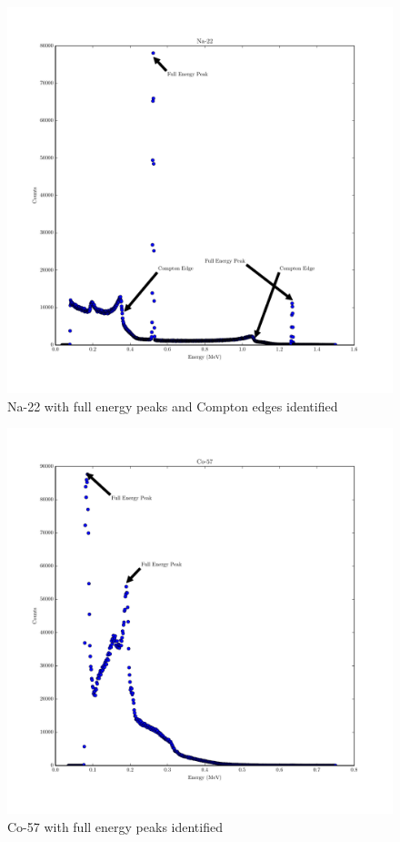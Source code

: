 \documentclass[reprint, nobibnotes, amssymb, amsmath, amsfonts, physics, mathtools, mathrsfs, floatfix]{revtex4-1}
\begin{document}
\begin{widetext}
      \begin{figure}[h]
        \centering
        \includegraphics[width=\linewidth]{../plots/Na-22.pdf}
        \caption{Na-22 with full energy peaks and Compton edges identified \label{fig:na}}
      \end{figure}

      \begin{figure}[h]
        \centering
        \includegraphics[width=\linewidth]{../plots/Co-57.pdf}
        \caption{Co-57 with full energy peaks identified \label{fig:co}}
      \end{figure}


\end{widetext}
\end{document}

